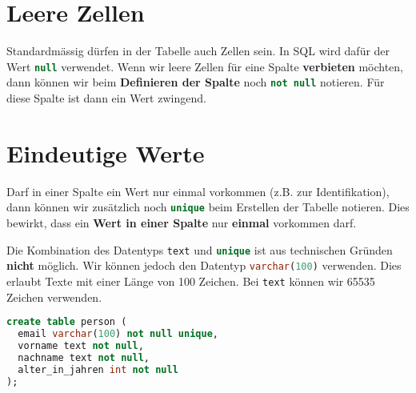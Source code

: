 \section{Leere Zellen}

Standardmässig dürfen in der Tabelle auch Zellen  sein. In \ac{SQL} wird dafür der Wert \lstinline[language=sql]{null} verwendet. Wenn wir leere Zellen für eine Spalte \textbf{verbieten} möchten, dann können wir beim \textbf{Definieren der Spalte} noch \lstinline[language=sql]{not null} notieren. Für diese Spalte ist dann ein Wert zwingend.

\section{Eindeutige Werte}

Darf in einer Spalte ein Wert nur einmal vorkommen (z.B. zur Identifikation), dann können wir zusätzlich noch \lstinline[language=sql]{unique} beim Erstellen der Tabelle notieren. Dies bewirkt, dass ein \textbf{Wert in einer Spalte} nur \textbf{einmal} vorkommen darf. 

\begin{important}
Die Kombination des Datentyps \lstinline[language=sql, morekeywords={text}]{text} und \lstinline[language=sql]{unique} ist aus technischen Gründen \textbf{nicht} möglich. Wir können jedoch den Datentyp \lstinline[language=sql]{varchar(100)} verwenden. Dies erlaubt Texte mit einer Länge von \num{100} Zeichen. Bei \lstinline[language=sql, morekeywords={text}]{text} können wir \num{65535} Zeichen verwenden.
\end{important}

\begin{lstlisting}[language=SQL, morekeywords={text, real}, caption={Pro Spalte ist ein Wert zwingend. Jede E-Mail-Adresse darf nur einmal vorhanden sein.}, label={lst-create-table-2}]
create table person (
  email varchar(100) not null unique,
  vorname text not null,
  nachname text not null,
  alter_in_jahren int not null
);
\end{lstlisting}